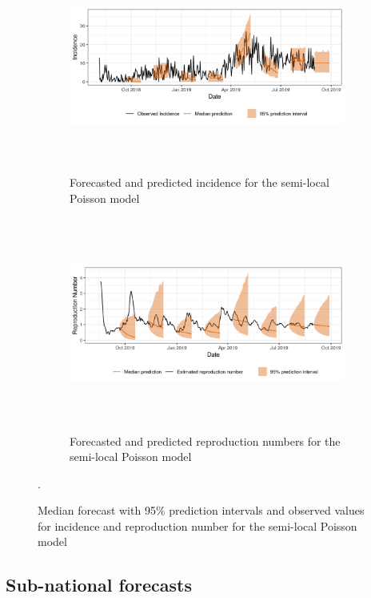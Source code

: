 \documentclass[12pt]{article}
\begin{document}
\begin{figure}[h!]
\begin{subfigure}{\textwidth}
  \centering
  \includegraphics[width=0.9\linewidth, height=7cm]{../output/national_predictions.png}  
  \caption{Forecasted and predicted incidence for the semi-local Poisson model}
  \label{fig:sub-first}
\end{subfigure}

\begin{subfigure}{\textwidth}
  \centering
  \includegraphics[width=0.9\linewidth, height=7cm]{../output/national_Rs.png}  
  \caption{Forecasted and predicted reproduction numbers for the semi-local Poisson model}
  \label{fig:sub-second}
\end{subfigure}
  \caption{Median forecast with 95\% prediction intervals and observed values for incidence and reproduction number for the semi-local Poisson model}.

  \label{fig:nat_pred}
\end{figure}

\subsection{Sub-national forecasts}
\end{document}
